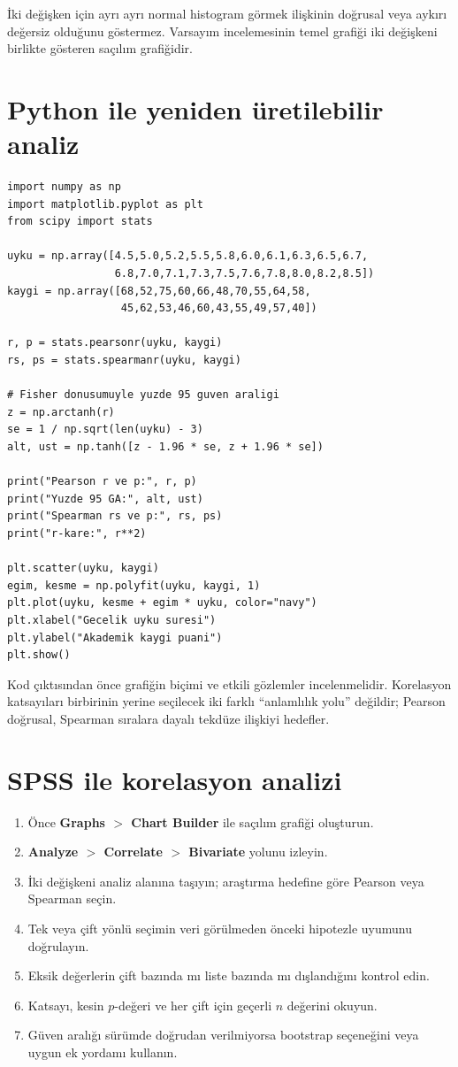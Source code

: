 \begin{assumptionbox}
İki değişken için ayrı ayrı normal histogram görmek ilişkinin doğrusal veya
aykırı değersiz olduğunu göstermez. Varsayım incelemesinin temel grafiği iki
değişkeni birlikte gösteren saçılım grafiğidir.
\end{assumptionbox}

\section{Python ile yeniden üretilebilir analiz}

\begin{lstlisting}
import numpy as np
import matplotlib.pyplot as plt
from scipy import stats

uyku = np.array([4.5,5.0,5.2,5.5,5.8,6.0,6.1,6.3,6.5,6.7,
                 6.8,7.0,7.1,7.3,7.5,7.6,7.8,8.0,8.2,8.5])
kaygi = np.array([68,52,75,60,66,48,70,55,64,58,
                  45,62,53,46,60,43,55,49,57,40])

r, p = stats.pearsonr(uyku, kaygi)
rs, ps = stats.spearmanr(uyku, kaygi)

# Fisher donusumuyle yuzde 95 guven araligi
z = np.arctanh(r)
se = 1 / np.sqrt(len(uyku) - 3)
alt, ust = np.tanh([z - 1.96 * se, z + 1.96 * se])

print("Pearson r ve p:", r, p)
print("Yuzde 95 GA:", alt, ust)
print("Spearman rs ve p:", rs, ps)
print("r-kare:", r**2)

plt.scatter(uyku, kaygi)
egim, kesme = np.polyfit(uyku, kaygi, 1)
plt.plot(uyku, kesme + egim * uyku, color="navy")
plt.xlabel("Gecelik uyku suresi")
plt.ylabel("Akademik kaygi puani")
plt.show()
\end{lstlisting}

Kod çıktısından önce grafiğin biçimi ve etkili gözlemler incelenmelidir.
Korelasyon katsayıları birbirinin yerine seçilecek iki farklı ``anlamlılık
yolu'' değildir; Pearson doğrusal, Spearman sıralara dayalı tekdüze ilişkiyi
hedefler.

\section{SPSS ile korelasyon analizi}

\begin{enumerate}
  \item Önce \textbf{Graphs $>$ Chart Builder} ile saçılım grafiği oluşturun.
  \item \textbf{Analyze $>$ Correlate $>$ Bivariate} yolunu izleyin.
  \item İki değişkeni analiz alanına taşıyın; araştırma hedefine göre Pearson veya Spearman seçin.
  \item Tek veya çift yönlü seçimin veri görülmeden önceki hipotezle uyumunu doğrulayın.
  \item Eksik değerlerin çift bazında mı liste bazında mı dışlandığını kontrol edin.
  \item Katsayı, kesin $p$-değeri ve her çift için geçerli $n$ değerini okuyun.
  \item Güven aralığı sürümde doğrudan verilmiyorsa bootstrap seçeneğini veya uygun ek yordamı kullanın.
\end{enumerate}

